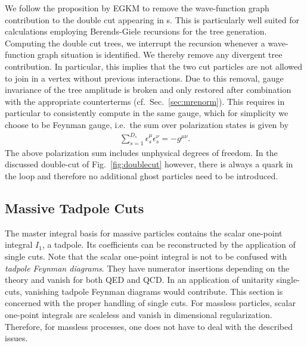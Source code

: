 We follow the proposition by EGKM \cite{Ellis:2008ir}
to remove the wave-function graph contribution to the double cut
appearing in \olb s. This is particularly well suited for
calculations employing Berends-Giele recursions for the tree
generation. Computing the double cut trees, we interrupt the recursion
whenever a wave-function graph situation is identified. We thereby
remove any divergent tree contribution. In particular, this implies
that the two cut particles are not allowed to join in a vertex without
previous interactions. Due to this
removal, gauge invariance of the tree amplitude is broken and only restored
after combination with the appropriate counterterms (cf.~Sec.~\ref{sec:mrenorm}). This requires in
particular to consistently compute in the same gauge, which for simplicity we choose to be Feynman gauge, i.e.~the sum over polarization states is given by
\begin{align}\label{eq:gluonpolsum}
  \sum_{s=1}^{D_s}\epsilon_s^\mu\epsilon_s^\nu = - g^{\mu\nu}.
\end{align}
The above polarization sum includes unphysical degrees of
freedom. In the discussed double-cut of Fig.~\ref{fig:doublecut} however, there is always a quark
in the loop and therefore no additional ghost particles need to be introduced.

\subsection{Massive Tadpole Cuts}
\label{sec:massivetadpoles}
The master integral basis for massive particles contains the scalar
one-point integral $I_1$, a tadpole. Its coefficients can be reconstructed by the application of single
cuts. Note that the scalar one-point integral is not to be confused with
\textit{tadpole Feynman diagrams}. They have numerator insertions depending on
the theory and vanish for both QED and QCD. In an application of
unitarity single-cuts, vanishing tadpole Feynman diagrams would contribute. This section is concerned with the proper handling of
single cuts. For massless particles, scalar one-point integrals are scaleless and vanish in dimensional
regularization. Therefore, for massless processes, one does not have
to deal with the described issues.

